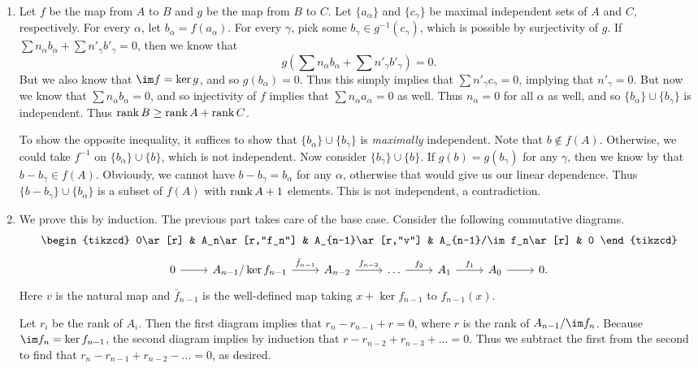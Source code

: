 \documentclass[../../solutions.tex]{subfiles}
\begin{document}
\begin{exercise} \leavevmode
\begin{enumerate}
\item Let $f$ be the map from $A$ to $B$ and $g$ be the map from $B$ to $C$.
Let $\{a_\alpha\}$ and $\{c_\gamma\}$ be maximal independent sets of $A$ and $C$, respectively. 
For every $\alpha$, let $b_\alpha=f(a_\alpha)$. 
For every $\gamma$, pick some $b_\gamma\in g^{-1}(c_\gamma)$, which is possible by surjectivity of $g$.
If $\sum n_\alpha b_\alpha+\sum n'_\gamma b'_\gamma=0$, then we know that \[g\left(\sum n_\alpha b_\alpha+\sum n'_\gamma b'_\gamma\right)=0.\]
But we also know that $\im f=\ker g$, and so $g(b_\alpha)=0$. 
Thus this simply implies that $\sum n'_\gamma c_\gamma=0$, implying that $n'_\gamma=0$. 
But now we know that $\sum n_\alpha b_\alpha=0$, and so injectivity of $f$ implies that $\sum n_\alpha a_\alpha=0$ as well. 
Thus $n_\alpha=0$ for all $\alpha$ as well, and so $\{b_\alpha\}\cup\{b_\gamma\}$ is independent. 
Thus $\operatorname{rank} B\ge\operatorname{rank} A+\operatorname{rank} C$. 

To show the opposite inequality, it suffices to show that $\{b_\alpha\}\cup\{b_\gamma\}$ is \textit{maximally} independent. 
Note that $b\not\in f(A)$. 
Otherwise, we could take $f^{-1}$ on $\{b_\alpha\}\cup\{b\}$, which is not independent. 
Now consider $\{b_\gamma\}\cup\{b\}$. 
If $g(b)=g(b_\gamma)$ for any $\gamma$, then we know by  that $b-b_\gamma\in f(A)$. 
Obviously, we cannot have $b-b_\gamma=b_\alpha$ for any $\alpha$, otherwise that would give us our linear dependence. 
Thus $\{b-b_\gamma\}\cup\{b_\alpha\}$ is a subset of $f(A)$ with $\operatorname{rank} A+1$ elements. 
This is not independent, a contradiction. 

\item We prove this by induction. 
The previous part takes care of the base case. 
Consider the following commutative diagrams. 
\[\begin{tikzcd}
0\ar[r] & A_n\ar[r,"f_n"] & A_{n-1}\ar[r,"v"] & A_{n-1}/\im f_n\ar[r] & 0
\end{tikzcd}\]
\[\begin{tikzcd}
0\ar[r] & A_{n-1}/\ker f_{n-1}\ar[r,"\bar f_{n-1}"] & A_{n-2}\ar[r,"f_{n-2}"] & \dots\ar[r,"f_2"] & A_1\ar[r,"f_1"] & A_0\ar[r] & 0.
\end{tikzcd}\]
Here $v$ is the natural map and $\bar f_{n-1}$ is the well-defined map taking $x+\ker f_{n-1}$ to $f_{n-1}(x)$. 

Let $r_i$ be the rank of $A_i$. 
Then the first diagram implies that $r_n-r_{n-1}+r=0$, where $r$ is the rank of $A_{n-1}/\im f_n$. 
Because $\im f_n=\ker f_{n-1}$, the second diagram implies by induction that $r-r_{n-2}+r_{n-3}+\dots=0$. 
Thus we subtract the first from the second to find that $r_n-r_{n-1}+r_{n-2}-\dots=0$, as desired. 
\end{enumerate}
\end{exercise}
\end{document}
